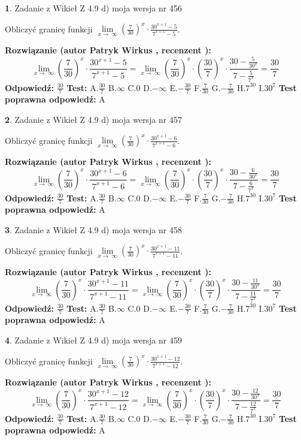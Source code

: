 \documentclass[12pt, a4paper]{article}
\theoremstyle{definition} %
\newtheorem{zad}{}
\newcommand{\zadStart}[1]{\begin{zad}#1\newline}
\newcommand{\zadStop}{\end{zad}}
\newcommand{\rozwStart}[2]{\noindent \textbf{Rozwiązanie (autor #1 , recenzent #2): }\newline}
\newcommand{\rozwStop}{\newline}
\newcommand{\odpStart}{\noindent \textbf{Odpowiedź:}\newline}
\newcommand{\odpStop}{\newline}
\newcommand{\testStart}{\noindent \textbf{Test:}\newline}
\newcommand{\testStop}{\newline}
\newcommand{\kluczStart}{\noindent \textbf{Test poprawna odpowiedź:}\newline}
\newcommand{\kluczStop}{\newline}
\begin{document}
\zadStart{Zadanie z Wikieł Z 4.9 d) moja wersja nr 456}


Obliczyć granicę funkcji  $\lim\limits_{x\to\ \infty}(\frac{7}{30})^{x}\cdot\frac{30^{x+1}-5}{7^{x+1}-5}$.
\zadStop
\rozwStart{Patryk Wirkus}{}
$$\lim\limits_{x\to\ \infty}(\frac{7}{30})^{x}\cdot\frac{30^{x+1}-5}{7^{x+1}-5}=\lim\limits_{x\to\ \infty}(\frac{7}{30})^{x}\cdot(\frac{30}{7})^{x} \cdot \frac{30-\frac{5}{30^{x}}}{7-\frac{5}{7^{x}}} = \frac{30}{7}$$
\rozwStop
\odpStart
$\frac{30}{7}$
\odpStop
\testStart
A.$\frac{30}{7}$ B.$\infty$ C.$0$ D.$-\infty$ E.$-\frac{30}{7}$
F.$\frac{7}{30}$ G.$-\frac{7}{30}$
H.$7^{30}$
I.$30^{7}$
\testStop
\kluczStart
A
\kluczStop



\zadStart{Zadanie z Wikieł Z 4.9 d) moja wersja nr 457}


Obliczyć granicę funkcji  $\lim\limits_{x\to\ \infty}(\frac{7}{30})^{x}\cdot\frac{30^{x+1}-6}{7^{x+1}-6}$.
\zadStop
\rozwStart{Patryk Wirkus}{}
$$\lim\limits_{x\to\ \infty}(\frac{7}{30})^{x}\cdot\frac{30^{x+1}-6}{7^{x+1}-6}=\lim\limits_{x\to\ \infty}(\frac{7}{30})^{x}\cdot(\frac{30}{7})^{x} \cdot \frac{30-\frac{6}{30^{x}}}{7-\frac{6}{7^{x}}} = \frac{30}{7}$$
\rozwStop
\odpStart
$\frac{30}{7}$
\odpStop
\testStart
A.$\frac{30}{7}$ B.$\infty$ C.$0$ D.$-\infty$ E.$-\frac{30}{7}$
F.$\frac{7}{30}$ G.$-\frac{7}{30}$
H.$7^{30}$
I.$30^{7}$
\testStop
\kluczStart
A
\kluczStop



\zadStart{Zadanie z Wikieł Z 4.9 d) moja wersja nr 458}


Obliczyć granicę funkcji  $\lim\limits_{x\to\ \infty}(\frac{7}{30})^{x}\cdot\frac{30^{x+1}-11}{7^{x+1}-11}$.
\zadStop
\rozwStart{Patryk Wirkus}{}
$$\lim\limits_{x\to\ \infty}(\frac{7}{30})^{x}\cdot\frac{30^{x+1}-11}{7^{x+1}-11}=\lim\limits_{x\to\ \infty}(\frac{7}{30})^{x}\cdot(\frac{30}{7})^{x} \cdot \frac{30-\frac{11}{30^{x}}}{7-\frac{11}{7^{x}}} = \frac{30}{7}$$
\rozwStop
\odpStart
$\frac{30}{7}$
\odpStop
\testStart
A.$\frac{30}{7}$ B.$\infty$ C.$0$ D.$-\infty$ E.$-\frac{30}{7}$
F.$\frac{7}{30}$ G.$-\frac{7}{30}$
H.$7^{30}$
I.$30^{7}$
\testStop
\kluczStart
A
\kluczStop



\zadStart{Zadanie z Wikieł Z 4.9 d) moja wersja nr 459}


Obliczyć granicę funkcji  $\lim\limits_{x\to\ \infty}(\frac{7}{30})^{x}\cdot\frac{30^{x+1}-12}{7^{x+1}-12}$.
\zadStop
\rozwStart{Patryk Wirkus}{}
$$\lim\limits_{x\to\ \infty}(\frac{7}{30})^{x}\cdot\frac{30^{x+1}-12}{7^{x+1}-12}=\lim\limits_{x\to\ \infty}(\frac{7}{30})^{x}\cdot(\frac{30}{7})^{x} \cdot \frac{30-\frac{12}{30^{x}}}{7-\frac{12}{7^{x}}} = \frac{30}{7}$$
\rozwStop
\odpStart
$\frac{30}{7}$
\odpStop
\testStart
A.$\frac{30}{7}$ B.$\infty$ C.$0$ D.$-\infty$ E.$-\frac{30}{7}$
F.$\frac{7}{30}$ G.$-\frac{7}{30}$
H.$7^{30}$
I.$30^{7}$
\testStop
\kluczStart
A
\kluczStop
\end{document}
